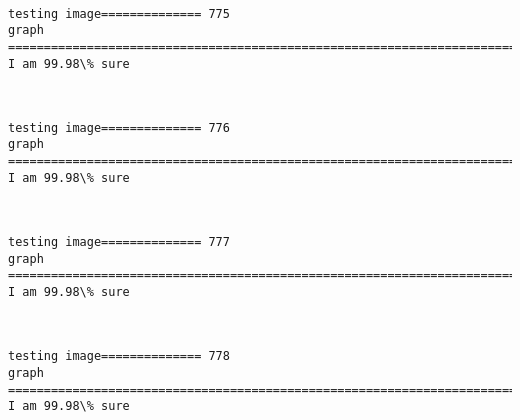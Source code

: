 \documentclass[11pt]{article}
\begin{document}
    \begin{center}
    \end{center}
    { \hspace*{\fill} \\}
    
    \begin{Verbatim}[commandchars=\\\{\}]
testing image============== 775
graph
============================================================================
I am 99.98\% sure

    \end{Verbatim}

    \begin{center}
    \end{center}
    { \hspace*{\fill} \\}
    
    \begin{Verbatim}[commandchars=\\\{\}]
testing image============== 776
graph
============================================================================
I am 99.98\% sure

    \end{Verbatim}

    \begin{center}
    \end{center}
    { \hspace*{\fill} \\}
    
    \begin{Verbatim}[commandchars=\\\{\}]
testing image============== 777
graph
============================================================================
I am 99.98\% sure

    \end{Verbatim}

    \begin{center}
    \end{center}
    { \hspace*{\fill} \\}
    
    \begin{Verbatim}[commandchars=\\\{\}]
testing image============== 778
graph
============================================================================
I am 99.98\% sure

    \end{Verbatim}
\end{document}
